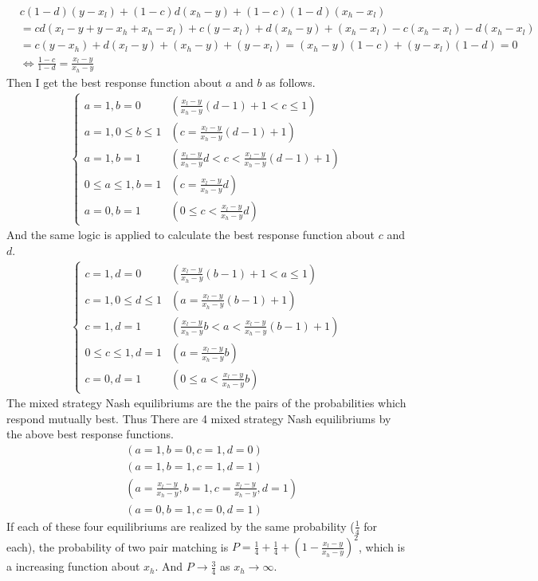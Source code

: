 \documentclass{article}
\begin{document}
	\begin{align}
	&c(1 - d)(y - x_l) + (1 - c)d(x_h - y) + (1-c)(1-d)(x_h - x_l) \nonumber \\
	&= cd(x_l - y + y -x_h + x_h - x_l) + c(y - x_l) + d(x_h - y) + (x_h - x_l) - c(x_h - x_l) - d(x_h - x_l)\nonumber \\
	&= c(y - x_h) + d(x_l - y) + (x_h - y) + (y - x_l) = (x_h - y)(1 - c) + (y - x_l)(1 - d) = 0 \nonumber \\
	&\Leftrightarrow \frac{1-c}{1-d} = \frac{x_l - y}{x_h - y}
	\end{align}
	Then I get the best response function about $a$ and $b$ as follows.
	\begin{align*}
            	\begin{cases}
            	a = 1, b= 0 & \left( \frac{x_l - y}{x_h - y}(d-1) + 1 < c \leq 1 \right) \\[8pt]
            	a = 1, 0 \leq b \leq 1 & \left( c = \frac{x_l - y}{x_h - y}(d-1) + 1 \right) \\[8pt]
		a = 1, b = 1 & \left( \frac{x_l - y}{x_h - y}d < c < \frac{x_l - y}{x_h - y}(d-1) + 1 \right) \\[8pt]
		0 \leq a \leq 1, b = 1 & \left( c = \frac{x_l - y}{x_h - y}d \right) \\[8pt]
		a = 0, b = 1 & \left( 0 \leq c < \frac{x_l - y}{x_h - y}d \right)
            	\end{cases}
	\end{align*}
	And the same logic is applied to calculate the best response function about $c$ and $d$.
	\begin{align*}
            	\begin{cases}
            	c = 1, d= 0 & \left( \frac{x_l - y}{x_h - y}(b-1) + 1 < a \leq 1 \right) \\[8pt]
            	c = 1, 0 \leq d \leq 1 & \left( a = \frac{x_l - y}{x_h - y}(b-1) + 1 \right) \\[8pt]
		c = 1, d = 1 & \left( \frac{x_l - y}{x_h - y}b < a < \frac{x_l - y}{x_h - y}(b-1) + 1 \right) \\[8pt]
		0 \leq c \leq 1, d = 1 & \left( a = \frac{x_l - y}{x_h - y}b \right) \\[8pt]
		c = 0, d = 1 & \left( 0 \leq a < \frac{x_l - y}{x_h - y}b \right)
            	\end{cases}
	\end{align*}
	The mixed strategy Nash equilibriums are the the pairs of the probabilities which respond mutually best. Thus There are 4 mixed strategy Nash equilibriums by the above best response functions.
	\begin{align}
	&(a = 1, b = 0, c = 1, d = 0)\\
	&(a = 1, b = 1, c =1, d = 1)\\
	&\left(a = \frac{x_l - y}{x_h - y}, b = 1, c = \frac{x_l - y}{x_h - y}, d = 1 \right)\\
	&(a = 0, b = 1, c = 0, d = 1)
	\end{align}
	If each of these four equilibriums are realized by the same probability ($\frac{1}{4}$ for each), the probability of two pair matching is $P = \frac{1}{4} + \frac{1}{4} + \left( 1 - \frac{x_l - y}{x_h - y} \right)^2$, which is a increasing function about $x_h$. And $P \to \frac{3}{4}$ as $x_h \to \infty$.
\end{document}
